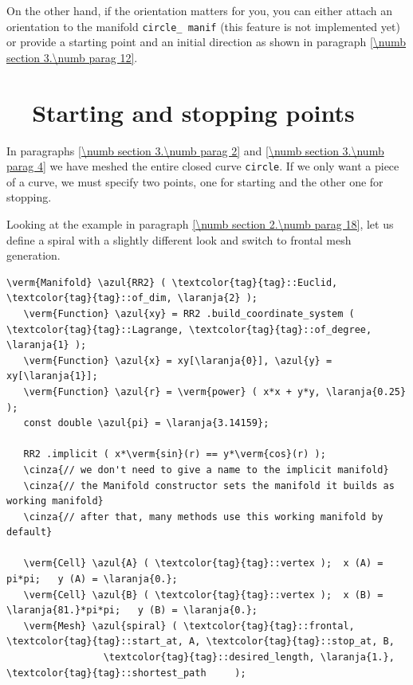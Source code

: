 On the other hand, if the orientation matters for you, you can either attach an orientation
to the manifold {\small\tt circle\_\,manif} (this feature is not implemented yet)
or provide a starting point and an initial direction as shown in paragraph
\ref{\numb section 3.\numb parag 12}.


\section{~~Starting and stopping points}\label{\numb section 3.\numb parag 5}

In paragraphs \ref{\numb section 3.\numb parag 2} and \ref{\numb section 3.\numb parag 4}
we have meshed the entire closed curve {\small\tt circle}.
If we only want a piece of a curve, we must specify two points, one for starting and
the other one for stopping.

Looking at the example in paragraph \ref{\numb section 2.\numb parag 18}, let us define a
spiral with a slightly different look and switch to frontal mesh generation.

\begin{Verbatim}[commandchars=\\\{\},formatcom=\small\tt,frame=single,
   label=parag-\ref{\numb section 3.\numb parag 5}.cpp,rulecolor=\color{moldura},
   baselinestretch=0.94,framesep=2mm                                            ]
   \verm{Manifold} \azul{RR2} ( \textcolor{tag}{tag}::Euclid, \textcolor{tag}{tag}::of_dim, \laranja{2} );
   \verm{Function} \azul{xy} = RR2 .build_coordinate_system ( \textcolor{tag}{tag}::Lagrange, \textcolor{tag}{tag}::of_degree, \laranja{1} );
   \verm{Function} \azul{x} = xy[\laranja{0}], \azul{y} = xy[\laranja{1}];
   \verm{Function} \azul{r} = \verm{power} ( x*x + y*y, \laranja{0.25} );
   const double \azul{pi} = \laranja{3.14159};
   
   RR2 .implicit ( x*\verm{sin}(r) == y*\verm{cos}(r) );
   \cinza{// we don't need to give a name to the implicit manifold}
   \cinza{// the Manifold constructor sets the manifold it builds as working manifold}
   \cinza{// after that, many methods use this working manifold by default}
   
   \verm{Cell} \azul{A} ( \textcolor{tag}{tag}::vertex );  x (A) =     pi*pi;   y (A) = \laranja{0.};
   \verm{Cell} \azul{B} ( \textcolor{tag}{tag}::vertex );  x (B) = \laranja{81.}*pi*pi;   y (B) = \laranja{0.};
   \verm{Mesh} \azul{spiral} ( \textcolor{tag}{tag}::frontal, \textcolor{tag}{tag}::start_at, A, \textcolor{tag}{tag}::stop_at, B,
                 \textcolor{tag}{tag}::desired_length, \laranja{1.}, \textcolor{tag}{tag}::shortest_path     );
\end{Verbatim}

